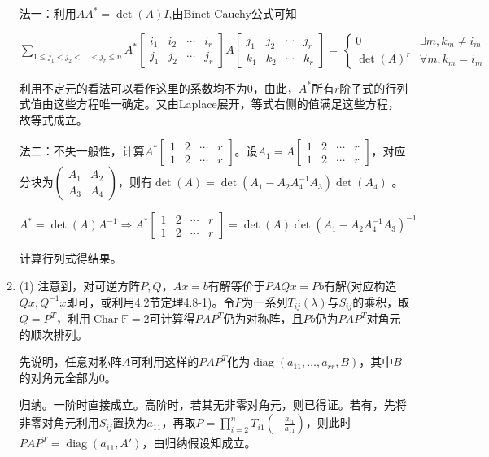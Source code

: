 \documentclass[a4paper,UTF8,fontset=windows]{ctexart}
\DeclareMathOperator{\Char}{Char}
\DeclareMathOperator{\diag}{diag}
\begin{document}
\begin{enumerate}
法一：利用$AA^\ast=\det(A)I$,由Binet-Cauchy公式可知

$\sum_{1\le j_1<j_2<\dots<j_r\le n}{A^\ast\begin{bmatrix}i_1&i_2&\cdots&i_r\\j_1&j_2&\cdots&j_r\end{bmatrix}A\begin{bmatrix}j_1&j_2&\cdots&j_r\\k_1&k_2&\cdots&k_r\end{bmatrix}}=\begin{cases}0&\exists m,k_m\ne i_m\\\det(A)^r&\forall m,k_m=i_m\end{cases}$

利用不定元的看法可以看作这里的系数均不为0，由此，$A^\ast$所有$r$阶子式的行列式值由这些方程唯一确定。又由Laplace展开，等式右侧的值满足这些方程，故等式成立。

法二：不失一般性，计算$A^\ast\begin{bmatrix}1&2&\cdots&r\\1&2&\cdots&r\end{bmatrix}$。设$A_1=A\begin{bmatrix}1&2&\cdots&r\\1&2&\cdots&r\end{bmatrix}$，对应分块为$\begin{pmatrix}A_1&A_2\\A_3&A_4\end{pmatrix}$，则有$\det(A)=\det(A_1-A_2A_4^{-1}A_3)\det(A_4)$
。

$A^\ast=\det(A)A^{-1}\Rightarrow A^\ast\begin{bmatrix}1&2&\cdots&r\\1&2&\cdots&r\end{bmatrix}=\det(A)\det(A_1-A_2A_4^{-1}A_3)^{-1}$

计算行列式得结果。

\item
(1) 注意到，对可逆方阵$P,Q$，$Ax=b$有解等价于$PAQx=Pb$有解(对应构造$Qx,Q^{-1}x$即可，或利用4.2节定理4.8-1)。令$P$为一系列$T_{ij}(\lambda)$与$S_{ij}$的乘积，取$Q=P^T$，利用$\Char\mathbb{F}=2$可计算得$PAP^T$仍为对称阵，且$Pb$仍为$PAP^T$对角元的顺次排列。

先说明，任意对称阵$A$可利用这样的$PAP^T$化为$\diag(a_{11},\dots,a_{rr},B)$，其中$B$的对角元全部为0。

归纳。一阶时直接成立。高阶时，若其无非零对角元，则已得证。若有，先将非零对角元利用$S_{ij}$置换为$a_{11}$，再取$P=\prod_{i=2}^n{T_{i1}(-\frac{a_{i1}}{a_{11}})}$，则此时$PAP^T=\diag(a_{11},A')$，由归纳假设知成立。


\end{enumerate}
\end{document}
